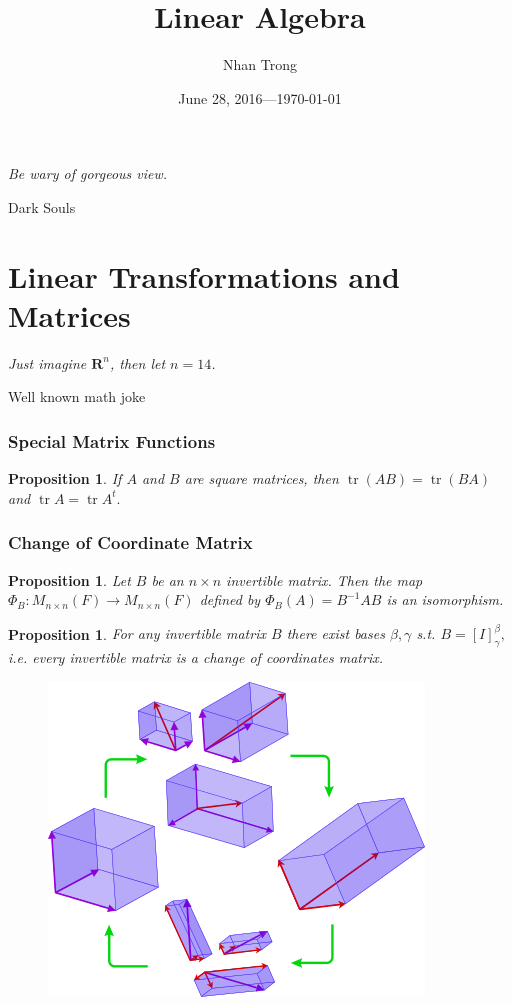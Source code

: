 \documentclass[12pt]{article}
\title{Linear Algebra}
\author{Nhan Trong}
\date{June 28, 2016---\today}
\theoremstyle{plain}
\newtheorem{proposition}[theorem]{Proposition}
\theoremstyle{definition}
\theoremstyle{remark}
\newcommand{\R}{\mathbf R}
\DeclareMathOperator{\tr}{tr}
\begin{document}
\maketitle

\epigraph{\textit{Be wary of gorgeous view.}}{Dark Souls}

\tableofcontents %

\part{Linear Transformations and Matrices}

\epigraph{\textit{Just imagine $\R^n$, then let $n = 14$.}}{Well known math joke}

\section{Special Matrix Functions}

\begin{proposition}\label{tracecommutative}
If $A$ and $B$ are square matrices, then $\tr(AB) = \tr(BA)$ and $\tr A = \tr A^t.$
\end{proposition}

\section{Change of Coordinate Matrix}

\begin{proposition}\label{matrixbasisrep}
Let $B$ be an $n \times n$ invertible matrix. Then the map $\Phi_B: M_{n\times n}(F) \longrightarrow M_{n\times n}(F)$ defined by $\Phi_B(A) = B^{-1} A B$ is an isomorphism.
\end{proposition}

\begin{proposition}
For any invertible matrix $B$ there exist bases $\beta, \gamma$ s.t. $B = [I]^\beta_\gamma,$ i.e. every invertible matrix is a change of coordinates matrix.
\end{proposition}

\begin{figure}[H]
\centering
\includegraphics[width=.7\textwidth]{377px-3d_basis_transformation}
\end{figure}
\end{document}
